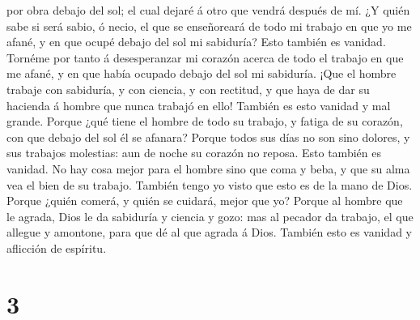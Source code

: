 por obra debajo del sol; el cual dejaré á otro que vendrá después de mí.
 ¿Y quién sabe si será sabio, ó necio, el que se
enseñoreará de todo mi trabajo en que yo me afané, y en que ocupé debajo
del sol mi sabiduría? Esto también es vanidad.  Tornéme
por tanto á desesperanzar mi corazón acerca de todo el trabajo en que me
afané, y en que había ocupado debajo del sol mi sabiduría.
 ¡Que el hombre trabaje con sabiduría, y con ciencia, y
con rectitud, y que haya de dar su hacienda á hombre que nunca trabajó
en ello! También es esto vanidad y mal grande.  Porque
¿qué tiene el hombre de todo su trabajo, y fatiga de su corazón, con que
debajo del sol él se afanara?  Porque todos sus días no
son sino dolores, y sus trabajos molestias: aun de noche su corazón no
reposa. Esto también es vanidad.  No hay cosa mejor para
el hombre sino que coma y beba, y que su alma vea el bien de su trabajo.
También tengo yo visto que esto es de la mano de Dios. 
Porque ¿quién comerá, y quién se cuidará, mejor que yo? 
Porque al hombre que le agrada, Dios le da sabiduría y ciencia y gozo:
mas al pecador da trabajo, el que allegue y amontone, para que dé al que
agrada á Dios. También esto es vanidad y aflicción de espíritu.

\hypertarget{section-2}{%
\section{3}\label{section-2}}

